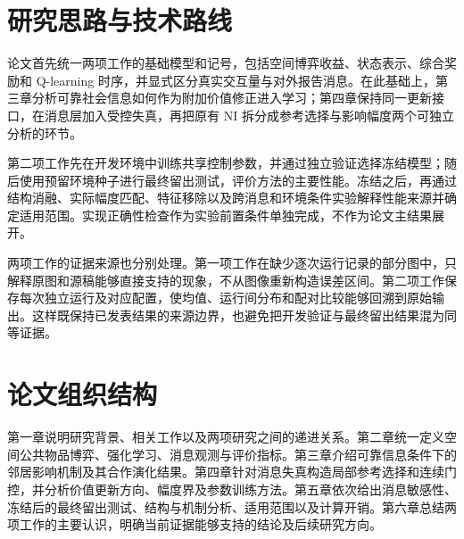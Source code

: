 \section{研究思路与技术路线}

论文首先统一两项工作的基础模型和记号，包括空间博弈收益、状态表示、综合奖励和 Q-learning 时序，并显式区分真实交互量与对外报告消息。在此基础上，第三章分析可靠社会信息如何作为附加价值修正进入学习；第四章保持同一更新接口，在消息层加入受控失真，再把原有 NI 拆分成参考选择与影响幅度两个可独立分析的环节。

第二项工作先在开发环境中训练共享控制参数，并通过独立验证选择冻结模型；随后使用预留环境种子进行最终留出测试，评价方法的主要性能。冻结之后，再通过结构消融、实际幅度匹配、特征移除以及跨消息和环境条件实验解释性能来源并确定适用范围。实现正确性检查作为实验前置条件单独完成，不作为论文主结果展开。

两项工作的证据来源也分别处理。第一项工作在缺少逐次运行记录的部分图中，只解释原图和源稿能够直接支持的现象，不从图像重新构造误差区间。第二项工作保存每次独立运行及对应配置，使均值、运行间分布和配对比较能够回溯到原始输出。这样既保持已发表结果的来源边界，也避免把开发验证与最终留出结果混为同等证据。

\section{论文组织结构}

第一章说明研究背景、相关工作以及两项研究之间的递进关系。第二章统一定义空间公共物品博弈、强化学习、消息观测与评价指标。第三章介绍可靠信息条件下的邻居影响机制及其合作演化结果。第四章针对消息失真构造局部参考选择和连续门控，并分析价值更新方向、幅度界及参数训练方法。第五章依次给出消息敏感性、冻结后的最终留出测试、结构与机制分析、适用范围以及计算开销。第六章总结两项工作的主要认识，明确当前证据能够支持的结论及后续研究方向。